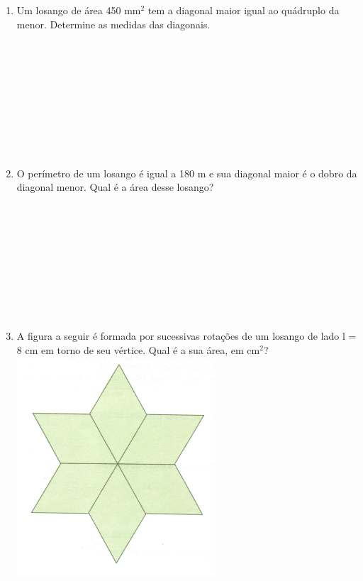 \documentclass[a4paper,14pt]{article}
\begin{document}
\begin{multicols}{2}
\begin{enumerate}
\begin{enumerate}[a)]
	    	\end{enumerate}
    		\item Um losango de área 450 mm$^2$ tem a diagonal maior igual ao quádruplo da menor. Determine as medidas das diagonais. \\\\\\\\\\\\\\\\\\\\
    		\item O perímetro de um losango é igual a 180 m e sua diagonal maior é o dobro da diagonal menor. Qual é a área desse losango? \\\\\\\\\\\\\\\\\\\\
    		\item A figura a seguir é formada por sucessivas rotações de um losango de lado l = 8 cm em torno de seu vértice. Qual é a sua área, em cm$^2$?\\
    			\includegraphics[width=0.7\linewidth]{8FMA28_imagens/pg147.png}\\\\\\\\\\\\\\\\
    			

\end{enumerate}
\end{multicols}
\end{document}
